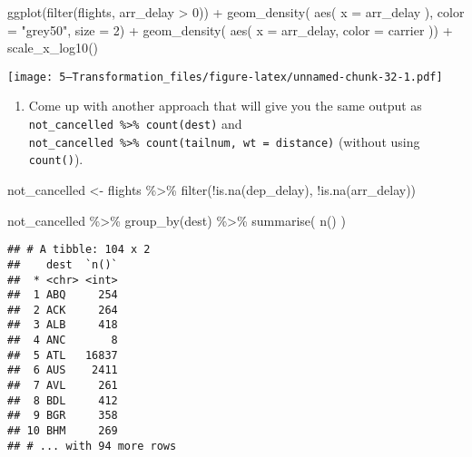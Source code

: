 \documentclass[
]{article}
\newenvironment{Shaded}{\begin{snugshade}}{\end{snugshade}}
\newcommand{\AttributeTok}[1]{\textcolor[rgb]{0.77,0.63,0.00}{#1}}
\newcommand{\DecValTok}[1]{\textcolor[rgb]{0.00,0.00,0.81}{#1}}
\newcommand{\FunctionTok}[1]{\textcolor[rgb]{0.00,0.00,0.00}{#1}}
\newcommand{\NormalTok}[1]{#1}
\newcommand{\OtherTok}[1]{\textcolor[rgb]{0.56,0.35,0.01}{#1}}
\newcommand{\SpecialCharTok}[1]{\textcolor[rgb]{0.00,0.00,0.00}{#1}}
\newcommand{\StringTok}[1]{\textcolor[rgb]{0.31,0.60,0.02}{#1}}
\providecommand{\tightlist}{%
  \setlength{\itemsep}{0pt}\setlength{\parskip}{0pt}}
\begin{document}
\begin{Shaded}
\begin{Highlighting}[]
\FunctionTok{ggplot}\NormalTok{(}\FunctionTok{filter}\NormalTok{(flights, arr\_delay }\SpecialCharTok{\textgreater{}} \DecValTok{0}\NormalTok{)) }\SpecialCharTok{+}
  \FunctionTok{geom\_density}\NormalTok{( }\FunctionTok{aes}\NormalTok{( }\AttributeTok{x =}\NormalTok{ arr\_delay ), }\AttributeTok{color =} \StringTok{"grey50"}\NormalTok{, }\AttributeTok{size =} \DecValTok{2}\NormalTok{) }\SpecialCharTok{+}
  \FunctionTok{geom\_density}\NormalTok{( }\FunctionTok{aes}\NormalTok{( }\AttributeTok{x =}\NormalTok{ arr\_delay, }\AttributeTok{color =}\NormalTok{ carrier )) }\SpecialCharTok{+}
  \FunctionTok{scale\_x\_log10}\NormalTok{()}
\end{Highlighting}
\end{Shaded}

\texttt{[image: 5---Transformation\_files/figure-latex/unnamed-chunk-32-1.pdf]}

\begin{enumerate}
\def\labelenumi{\arabic{enumi}.}
\tightlist
\item
  Come up with another approach that will give you the same output as
  \texttt{not\_cancelled\ \%\textgreater{}\%\ count(dest)} and
  \texttt{not\_cancelled\ \%\textgreater{}\%\ count(tailnum,\ wt\ =\ distance)}
  (without using \texttt{count()}).
\end{enumerate}

\begin{Shaded}
\begin{Highlighting}[]
\NormalTok{not\_cancelled }\OtherTok{\textless{}{-}}\NormalTok{ flights }\SpecialCharTok{\%\textgreater{}\%} 
  \FunctionTok{filter}\NormalTok{(}\SpecialCharTok{!}\FunctionTok{is.na}\NormalTok{(dep\_delay), }\SpecialCharTok{!}\FunctionTok{is.na}\NormalTok{(arr\_delay))}

\NormalTok{not\_cancelled }\SpecialCharTok{\%\textgreater{}\%} 
  \FunctionTok{group\_by}\NormalTok{(dest) }\SpecialCharTok{\%\textgreater{}\%} 
  \FunctionTok{summarise}\NormalTok{( }\FunctionTok{n}\NormalTok{() )}
\end{Highlighting}
\end{Shaded}

\begin{verbatim}
## # A tibble: 104 x 2
##    dest  `n()`
##  * <chr> <int>
##  1 ABQ     254
##  2 ACK     264
##  3 ALB     418
##  4 ANC       8
##  5 ATL   16837
##  6 AUS    2411
##  7 AVL     261
##  8 BDL     412
##  9 BGR     358
## 10 BHM     269
## # ... with 94 more rows
\end{verbatim}
\end{document}

